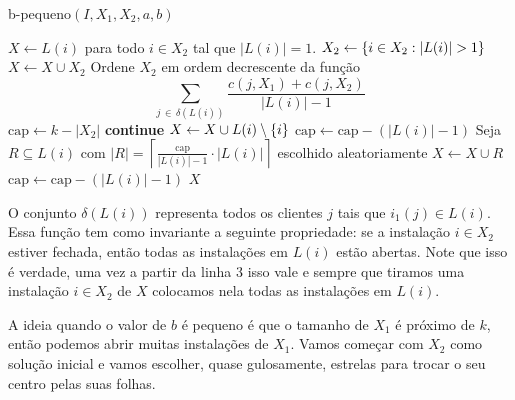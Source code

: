 \begin{algorithm}[H]
    \caption{\sc b-pequeno$(I,X_1,X_2,a,b)$}
    \begin{algorithmic}[1]
        \State $X \gets L(i)$ para todo $i \in X_2$ tal que $|L(i)| = 1$.
        \State $X_2 \gets \{i \in X_2 : |L(i)| > 1\}$
        \State $X \gets X \cup X_2$
        \State Ordene $X_2$ em ordem decrescente da função
                    \[\sum_{ j \, \in \, \delta(L(i))} \frac{ c(j,X_1) + c(j,X_2)} {|L(i)| - 1} \]
        \State $\text{cap} \gets k - |X_2|$
                \State \textbf{continue}
                \State $X \gets X \cup L(i) \setminus \{i\}$
                \State $\text{cap}\gets \text{cap}  - (|L(i)| - 1)$
            \Else
                \State Seja $R \subseteq L(i)$ com $|R| = \left\lceil \frac{\text{cap}}{|L(i)| - 1} \cdot |L(i)| \right\rceil$ escolhido aleatoriamente
                \State $X \gets X \cup R$
                \State $\text{cap} \gets \text{cap} - (|L(i)| - 1)$
            \EndIf
        \EndFor
        \State \Return $X$
    \end{algorithmic}
\end{algorithm}
O conjunto $\delta(L(i))$ representa todos os clientes $j$ tais que $i_1(j) \in L(i)$. Essa função tem como invariante a seguinte propriedade: se a instalação $i \in X_2$ estiver fechada, então todas as instalações em $L(i)$ estão abertas. Note que isso é verdade, uma vez a partir da linha 3 isso vale e sempre que tiramos uma instalação $i \in X_2$ de $X$ colocamos nela todas as instalações em $L(i)$.

A ideia quando o valor de $b$ é pequeno é que o tamanho de $X_1$ é próximo de $k$, então podemos abrir muitas instalações de $X_1$. 
Vamos começar com $X_2$ como solução inicial e vamos escolher, quase gulosamente, estrelas para trocar o seu centro pelas suas folhas.

